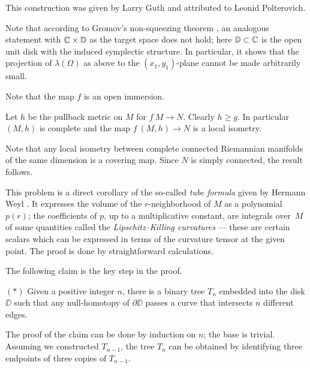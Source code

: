 This construction was given 
by Larry Guth \cite{guth-symplectic}
and attributed to Leonid Polterovich.

Note that according to Gromov's non-squeezing theorem \cite{gromov-pseudoholomorphic}, 
an analogous statement with $\mathbb{C}\times \mathbb{D}$ as the target space does not hold;
here $\mathbb{D}\subset \mathbb{C}$ is the open unit disk with the induced symplectic structure.
In particular, it shows that
the projection of $\lambda(\Omega)$ as above 
to the $(x_1,y_1)$-plane
cannot be made arbitrarily small.

Note that the map $f$ is an open immersion.

Let $h$ be the pullback metric on $M$ for $f\:M\to N$.
Clearly $h\ge g$.
In particular $(M,h)$ is complete and the map $f\:(M,h)\to N$ is a local isometry. 

Note that any local isometry between complete connected Riemannian manifolds of the same dimension is a covering map.
Since $N$ is simply connected, the result follows.
\qeds 


This problem is a direct corollary of the so-called \emph{tube formula} given by Hermann Weyl \cite{weyl}.
It expresses the volume of the $r$-neighborhood of $M$ as a polynomial $p(r)$;
the coefficients of $p$, up to a multiplicative constant, are integrals over~$M$ of some quantities called the \emph{Lipschitz--Killing curvatures} --- these are certain scalars which can be expressed in terms of the curvature tensor at the given point.
The proof is done by straightforward calculations.

 


The following claim is the key step in the proof.
\begin{cl}{$({*})$}
Given a positive integer $n$, there is a binary tree $T_n$ embedded into the disk $\DD$ such that any null-homotopy of $\partial \DD$ passes a curve that intersects $n$ different edges.
\end{cl}


The proof of the claim can be done by induction on $n$; the base is trivial.
Assuming we constructed $T_{n-1}$, the tree $T_n$ can be obtained by identifying three endpoints of three copies of $T_{n-1}$.

